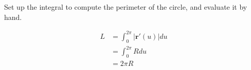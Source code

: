 Set up the integral to compute the perimeter of the circle, and evaluate it by hand.

\begin{solution}
\begin{align*}
    L &= \int_{0}^{2\pi} |\boldsymbol{r}'(u)| du \\
    &= \int_{0}^{2\pi} Rdu \\
    &= 2\pi R
\end{align*}
\end{solution}
